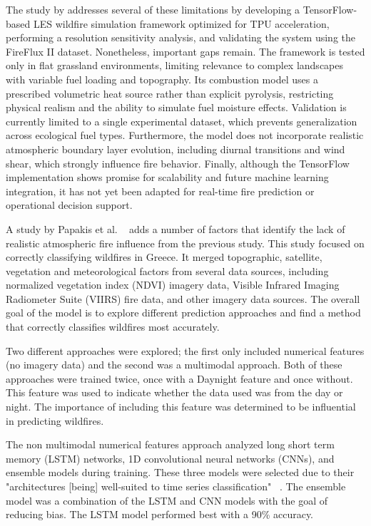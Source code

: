 \documentclass[conference]{IEEEtran}
\begin{document}
The study by \citep{wang2023high} addresses several of these limitations by developing a TensorFlow-based LES wildfire simulation framework optimized for TPU acceleration, performing a resolution sensitivity analysis, and validating the system using the FireFlux II dataset. Nonetheless, important gaps remain. The framework is tested only in flat grassland environments, limiting relevance to complex landscapes with variable fuel loading and topography. Its combustion model uses a prescribed volumetric heat source rather than explicit pyrolysis, restricting physical realism and the ability to simulate fuel moisture effects. Validation is currently limited to a single experimental dataset, which prevents generalization across ecological fuel types. Furthermore, the model does not incorporate realistic atmospheric boundary layer evolution, including diurnal transitions and wind shear, which strongly influence fire behavior. Finally, although the TensorFlow implementation shows promise for scalability and future machine learning integration, it has not yet been adapted for real-time fire prediction or operational decision support.

A study by Papakis et al. \ \cite{papakis2025AMultimodalEnsembleDeepLearning}  adds a number of factors that identify the lack of realistic atmospheric fire influence from the previous study. This study focused on correctly classifying wildfires in Greece. It merged topographic, satellite, vegetation and meteorological factors from several data sources, including normalized vegetation index (NDVI) imagery data, Visible Infrared Imaging Radiometer Suite (VIIRS) fire data, and other imagery data sources. The overall goal of the model is to explore different prediction approaches and find a method that correctly classifies wildfires most accurately.

Two different approaches were explored; the first only included numerical features (no imagery data) and the second was a multimodal approach. Both of these approaches were trained twice, once with a Daynight feature and once without. This feature was used to indicate whether the data used was from the day or night. The importance of including this feature was determined to be influential in predicting wildfires. 

The non multimodal numerical features approach analyzed long short term memory (LSTM) networks, 1D convolutional neural networks (CNNs), and ensemble models during training. These three models were selected due to their "architectures [being] well-suited to time series classification" \ \cite{papakis2025AMultimodalEnsembleDeepLearning}. The ensemble model was a combination of the LSTM and CNN models with the goal of reducing bias. The LSTM model performed best with a 90\% accuracy. 
\end{document}
